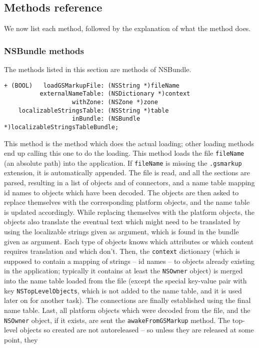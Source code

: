 \subsection{Methods reference}
We now list each method, followed by the explanation of what the
method does.

\subsubsection{NSBundle methods}
The methods listed in this section are methods of NSBundle.
\begin{verbatim}
+ (BOOL)   loadGSMarkupFile: (NSString *)fileName
          externalNameTable: (NSDictionary *)context
                   withZone: (NSZone *)zone
    localizableStringsTable: (NSString *)table
                   inBundle: (NSBundle *)localizableStringsTableBundle;
\end{verbatim}
This method is the method which does the actual loading; other loading
methods end up calling this one to do the loading.  This method loads
the file \texttt{fileName} (an absolute path) into the application.
If \texttt{fileName} is missing the \texttt{.gsmarkup} extension, it is
automatically appended.  The file is read, and all the sections are
parsed, resulting in a list of objects and of connectors, and a name
table mapping id names to objects which have been decoded.  The
objects are then asked to replace themselves with the corresponding
platform objects, and the name table is updated accordingly.  While
replacing themselves with the platform objects, the objects also
translate the eventual text which might need to be translated by using
the localizable strings given as argument, which is found in the
bundle given as argument.  Each type of objects knows which attributes
or which content requires translation and which don't.  Then, the
\texttt{context} dictionary (which is supposed to contain a mapping of
strings -- id names -- to objects already existing in the application;
typically it contains at least the \texttt{NSOwner} object) is merged
into the name table loaded from the file (except the special key-value
pair with key \texttt{NSTopLevelObjects}, which is not added to the
name table, and it is used later on for another task).  The
connections are finally established using the final name table.  Last,
all platform objects which were decoded from the file, and the
\texttt{NSOwner} object, if it exists, are sent the 
\texttt{awakeFromGSMarkup} method.  The top-level objects so created are
not autoreleased -- so unless they are released at some point, they
